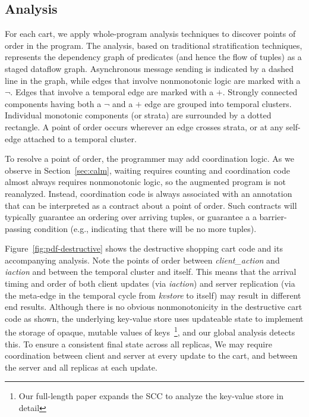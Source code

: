 \subsection{Analysis}


For each cart, we apply whole-program analysis techniques to discover points of 
order in the program.  The analysis, based on traditional stratification
techniques, represents the dependency graph of predicates (and hence the 
flow of tuples) as a staged dataflow graph.  Asynchronous message sending
is indicated by a dashed line in the graph, while edges that involve 
nonmonotonic logic are marked with a $\lnot$.  Edges that involve a temporal 
edge are marked with a $+$.  Strongly connected components having both a $\lnot$ and a $+$ edge are grouped into temporal clusters.  Individual monotonic components 
(or strata) are surrounded by a dotted rectangle.  A point of order occurs
wherever an edge crosses strata, or at any self-edge attached to a temporal cluster.

To resolve a point of order, the programmer may add coordination logic.
As we observe in Section~\ref{sec:calm}, waiting requires counting and coordination code almost always 
requires nonmonotonic logic, so the augmented program is not reanalyzed.
Instead, coordination code is always associated with an annotation that can
be interpreted as a contract about a point of order.  Such contracts will
typically guarantee an ordering over arriving tuples, or guarantee a 
a barrier-passing condition (e.g., indicating that there will be no more tuples).


Figure~\ref{fig:pdf-destructive} shows the destructive shopping cart code
and its accompanying analysis.  Note the points of order between \emph{client\_action} and \emph{iaction}
and between the temporal cluster and itself.  This means that the arrival 
timing and order of both client updates (via \emph{iaction}) and
server replication (via the meta-edge in the temporal cycle from 
\emph{kvstore} to itself) may result in different
end results.  Although there is no obvious nonmonotonicity in the destructive
cart code as shown, the underlying key-value store uses updateable state
to implement the storage of opaque, mutable values of 
keys~\footnote{Our full-length paper expands the SCC to analyze the
key-value store in detail}, 
and our global analysis detects this.
To ensure a consistent final state across all replicas, We may require coordination
between client and server at every update to the cart, and between the 
server and all replicas at each update.  

